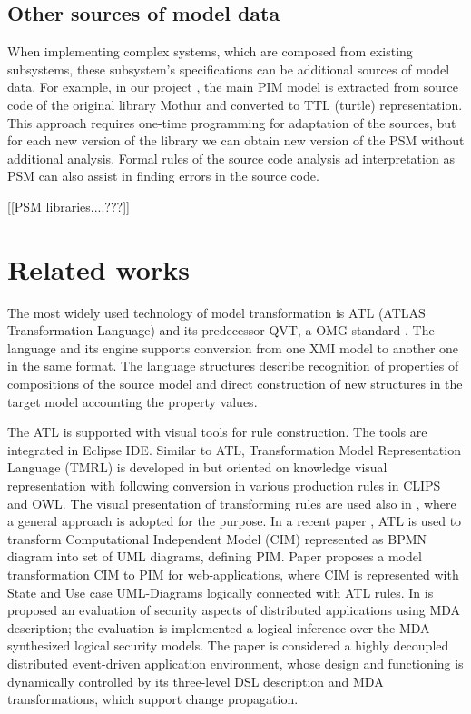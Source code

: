 \documentclass[conference]{IEEEtran}
\begin{document}

\subsection{Other sources of model data}
\label{sec:other-models}

When implementing complex systems, which are composed from existing subsystems, these subsystem's specifications can be additional sources of model data.  For example, in our project \cite{bit2019}, the main PIM model is extracted from source code of the original library Mothur and converted to TTL (turtle) representation.  This approach requires one-time programming for adaptation of the sources, but for each new version of the library we can obtain new version of the PSM without additional analysis.  Formal rules of the source code analysis ad interpretation as PSM can also assist in finding errors in the source code.

[[PSM libraries....???]]


\section{Related works}

The most widely used technology of model transformation is ATL (ATLAS Transformation Language) \cite{atl} and its predecessor QVT, a OMG standard \cite{QVT}.  The language and its engine supports conversion from one XMI model to another one in the same format.  The language structures describe recognition of properties of compositions of the source model and direct construction of new structures in the target model accounting the property values.

The ATL is supported with visual tools for rule construction.  The tools are integrated in Eclipse IDE.  Similar to ATL, Transformation Model Representation Language (TMRL) is developed in \cite{nikita} but oriented on knowledge visual representation with following conversion in various production rules in CLIPS and OWL.  The visual presentation of transforming rules are used also in \cite{GT}, where a general approach is adopted for the purpose.  In a recent paper \cite{azis}, ATL is used to transform Computational Independent Model (CIM) represented as BPMN diagram into set of UML diagrams, defining PIM. Paper \cite{Rhazali} proposes a model transformation CIM to PIM for web-applications, where CIM is represented with State and Use case UML-Diagrams logically connected with ATL rules.  In \cite{Hamid} is proposed an evaluation of security aspects of distributed applications using MDA description; the evaluation is implemented a logical inference over the MDA synthesized logical security models. The paper \cite{Zdun} is considered a highly decoupled distributed event-driven application environment, whose design and functioning is dynamically controlled by its three-level DSL description and MDA transformations, which support change propagation.
\end{document}
